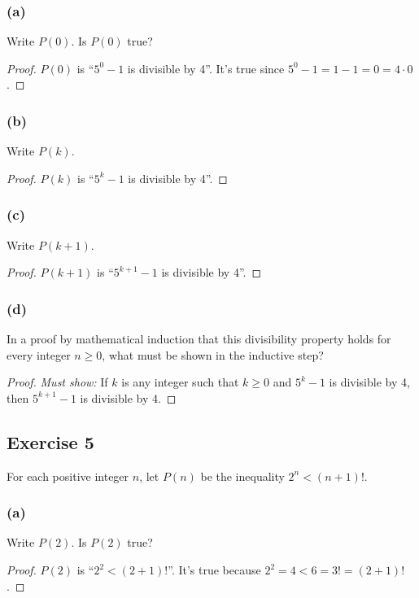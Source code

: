 \documentclass[14pt]{extarticle}
\begin{document}
\subsubsection{(a)}
Write $P(0)$. Is $P(0)$ true?

\begin{proof}
    $P(0)$ is ``$5^0 - 1$ is divisible by 4''. It's true since $5^0 - 1 = 1 - 1 = 0 = 4 \cdot 0$.
\end{proof}

\subsubsection{(b)}
Write $P(k)$.

\begin{proof}
    $P(k)$ is ``$5^k - 1$ is divisible by 4''.
\end{proof}

\subsubsection{(c)}
Write $P(k + 1)$.

\begin{proof}
    $P(k+1)$ is ``$5^{k+1} - 1$ is divisible by 4''.
\end{proof}

\subsubsection{(d)}
In a proof by mathematical induction that this divisibility property holds for every integer $n \geq 0$, what must be shown in the inductive step?

\begin{proof}
    {\it Must show:} If $k$ is any integer such that $k \geq 0$ and $5^k - 1$ is divisible by 4, then $5^{k+1} - 1$ is divisible by 4.
\end{proof}

\subsection{Exercise 5}
For each positive integer $n$, let $P(n)$ be the inequality
$2^n < (n + 1)!$.

\subsubsection{(a)}
Write $P(2)$. Is $P(2)$ true?

\begin{proof}
    $P(2)$ is ``$2^2 < (2+1)!$''. It's true because $2^2 = 4 < 6 = 3! = (2+1)!$.
\end{proof}
\end{document}
